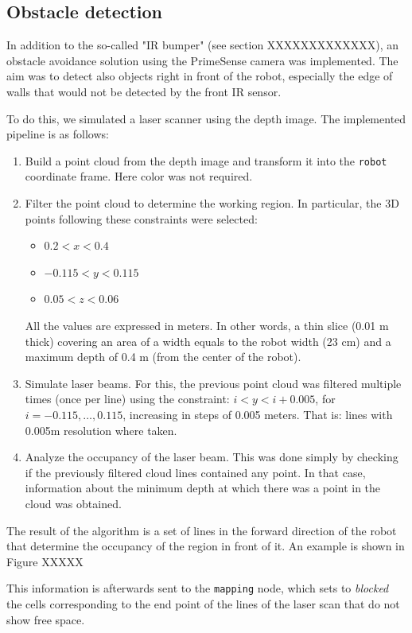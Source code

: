 \subsection{Obstacle detection}
\label{sec:Obstacle detection}

In addition to the so-called "IR bumper" (see section XXXXXXXXXXXXX), an obstacle avoidance solution using the PrimeSense camera was implemented. The aim was to detect also objects right in front of the robot, especially the edge of walls that would not be detected by the front IR sensor.

To do this, we simulated a laser scanner using the depth image. The implemented pipeline is as follows:

\begin{enumerate}
\item Build a point cloud from the depth image and transform it into the \texttt{robot} coordinate frame. Here color was not required. 
\item Filter the point cloud to determine the working region. In particular, the 3D points following these constraints were selected:
\begin{itemize}
\item $0.2 < x < 0.4$
\item $-0.115 < y < 0.115 $
\item $0.05 < z < 0.06$
\end{itemize}

All the values are expressed in meters. In other words, a thin slice (0.01 m thick) covering an area of a width equals to the robot width (23 cm) and a maximum depth of 0.4 m (from the center of the robot).

\item Simulate laser beams. For this, the previous point cloud was filtered multiple times (once per line) using the constraint: $ i < y < i+0.005$, for $i = -0.115, \dots, 0.115$, increasing in steps of 0.005 meters. That is: lines with 0.005m resolution where taken. 
\item Analyze the occupancy of the laser beam. This was done simply by checking if the previously filtered cloud lines contained any point. In that case, information about the minimum depth at which there was a point in the cloud was obtained.
\end{enumerate}

The result of the algorithm is a set of lines in the forward direction of the robot that determine the occupancy of the region in front of it. An example is shown in Figure XXXXX

This information is afterwards sent to the \texttt{mapping} node, which sets to \emph{blocked} the cells corresponding to the end point of the lines of the laser scan that do not show free space. 

